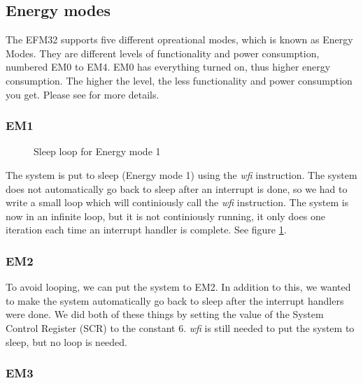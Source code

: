 	\subsection{Energy modes}
	The EFM32 supports five different opreational modes, which is known as Energy Modes. They are different levels of functionality and power consumption, numbered EM0 to EM4. EM0 has everything turned on, thus higher energy consumption. The higher the level, the less functionality and power consumption you get. Please see \cite[p. 2]{energy_optimization_application_note} for more details. 

	\subsubsection{EM1}
	\label{subsubsection:em1}

	\begin{figure}[t]
		
		\caption{Sleep loop for Energy mode 1}
		\label{code:em1}
	\end{figure}
	The system is put to sleep (Energy mode 1) using the \emph{wfi} instruction. The system does not automatically go back to sleep after an interrupt is done, so we had to write a small loop which will continiously call the \emph{wfi} instruction. The system is now in an infinite loop, but it is not continiously running, it only does one iteration each time an interrupt handler is complete. See figure \ref{code:em1}.

	\subsubsection{EM2}
	\label{subsubsection:em2}
	
%		

	To avoid looping, we can put the system to EM2. In addition to this, we  wanted to make the system automatically go back to sleep after the interrupt handlers were done. We did both of these things by setting the value of the System Control Register (SCR) to the constant $6$. \emph{wfi} is still needed to put the system to sleep, but no loop is needed.

		\subsubsection{EM3}
		\label{subsubsection:em3}	

